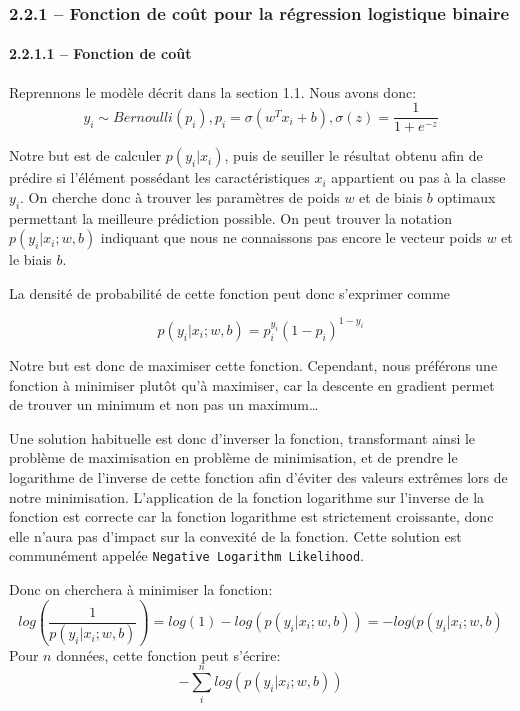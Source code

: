 \documentclass[
]{article}
\begin{document}
\subsubsection{2.2.1 -- Fonction de coût pour la régression logistique
binaire}\label{fonction-de-couxfbt-pour-la-ruxe9gression-logistique-binaire}

\paragraph{2.2.1.1 -- Fonction de coût}\label{fonction-de-couxfbt}

Reprennons le modèle décrit dans la section 1.1. Nous avons donc:
\[y_i \sim Bernoulli(p_i), p_i = \sigma(w^T x_i + b), \sigma(z) = \frac{1}{1+e^{-z}}\]

Notre but est de calculer \(p(y_i | x_i)\), puis de seuiller le résultat
obtenu afin de prédire si l'élément possédant les caractéristiques
\(x_i\) appartient ou pas à la classe \(y_i\). On cherche donc à trouver
les paramètres de poids \(w\) et de biais \(b\) optimaux permettant la
meilleure prédiction possible. On peut trouver la notation
\(p(y_i|x_i;w, b)\) indiquant que nous ne connaissons pas encore le
vecteur poids \(w\) et le biais \(b\).

La densité de probabilité de cette fonction peut donc s'exprimer comme

\[p(y_i|x_i; w, b) = p_i^{y_i}(1 - p_i)^{1 - y_i}\]

Notre but est donc de maximiser cette fonction. Cependant, nous
préférons une fonction à minimiser plutôt qu'à maximiser, car la
descente en gradient permet de trouver un minimum et non pas un
maximum\ldots{}

Une solution habituelle est donc d'inverser la fonction, transformant
ainsi le problème de maximisation en problème de minimisation, et de
prendre le logarithme de l'inverse de cette fonction afin d'éviter des
valeurs extrêmes lors de notre minimisation. L'application de la
fonction logarithme sur l'inverse de la fonction est correcte car la
fonction logarithme est strictement croissante, donc elle n'aura pas
d'impact sur la convexité de la fonction. Cette solution est communément
appelée \texttt{Negative\ Logarithm\ Likelihood}.

Donc on cherchera à minimiser la fonction:
\[log\left(\frac{1}{p(y_i|x_i;w,b)}\right) = log(1) - log(p(y_i|x_i;w,b)) = -log(p(y_i|x_i; w, b)\]
Pour \(n\) données, cette fonction peut s'écrire:
\[-\sum_i^n log(p(y_i|x_i;w,b))\]
\end{document}
